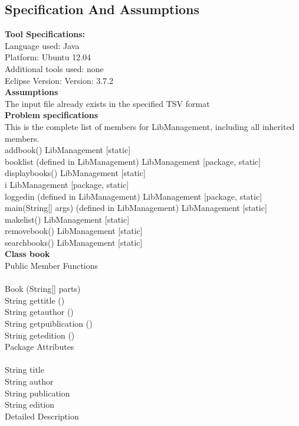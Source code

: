 \documentclass[paper=a4, fontsize=11pt]{scrartcl} %
\numberwithin{equation}{section} %
\numberwithin{figure}{section} %
\numberwithin{table}{section} %
\begin{document}
\subsection{Specification And Assumptions}
{\textbf {Tool Specifications:}}\\
Language used: Java\\
Platform: Ubuntu 12.04\\
Additional tools used: none\\
Eclipse Version: Version: 3.7.2\\

{\textbf{Assumptions}}\\
The input file already exists in the specified TSV format\\

\textbf{Problem specifications}\\
This is the complete list of members for LibManagement, including all inherited members.\\

addbook()	LibManagement	 [static]\\
booklist (defined in LibManagement)	LibManagement	 [package, static]\\
displaybooks()	LibManagement	 [static]\\
i	LibManagement	 [package, static]\\
loggedin (defined in LibManagement)	LibManagement	 [package, static]\\
main(String[] args) (defined in LibManagement)	LibManagement	 [static]\\
makelist()	LibManagement	 [static]\\
removebook()	LibManagement	 [static]\\
searchbooks()	LibManagement	 [static]\\

\textbf{Class book}\\


Public Member Functions\\
\\
 	Book (String[] parts)\\
String 	gettitle ()\\
String 	getauthor ()\\
String 	getpuiblication ()\\
String 	getedition ()\\
Package Attributes\\
\\
String 	title\\
String 	author\\
String 	publication\\
String 	edition\\
Detailed Description\\
\\
\end{document}
